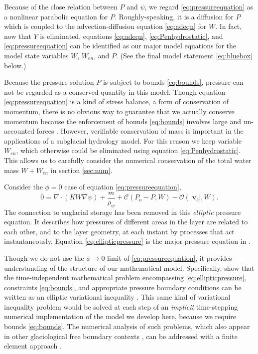 \documentclass[11pt,final]{amsart}
\newcommand\bv{\mathbf{v}}
\newcommand{\Div}{\nabla\cdot}
\newcommand{\grad}{\nabla}
\begin{document}
Because of the close relation between $P$ and $\psi$, we regard \eqref{eq:pressureequation} as a nonlinear parabolic equation for $P$.  Roughly-speaking, it is a diffusion for $P$ which is coupled to the advection-diffusion equation \eqref{eq:adeqn} for $W$.  In fact, now that $Y$ is eliminated, equations \eqref{eq:adeqn}, \eqref{eq:Penhydrostatic}, and \eqref{eq:pressureequation} can be identified as our major model equations for the model state variables $W$, $W_{en}$, and $P$.  (See the final model statement \eqref{eq:bluebox} below.)

Because the pressure solution $P$ is subject to bounds \eqref{eq:bounds}, pressure can not be regarded as a conserved quantity in this model.  Though equation \eqref{eq:pressureequation} is a kind of stress balance, a form of conservation of momentum, there is no obvious way to guarantee that we actually conserve momentum because the enforcement of bounds \eqref{eq:bounds} involves large and un-accounted forces \citep{Schoofetal2012}.  However, verifiable conservation of mass is important in the applications of a subglacial hydrology model.  For this reason we keep variable $W_{en}$, which otherwise could be eliminated using equation \eqref{eq:Penhydrostatic}.  This allows us to carefully consider the numerical conservation of the total water mass $W+W_{en}$ in section \ref{sec:num}.

Consider the $\phi=0$ case of equation \eqref{eq:pressureequation},
\begin{equation}
0 = \Div\left(K W \grad \psi\right) + \frac{m}{\rho_w} + \mathcal{C}(P_o-P,W) - \mathcal{O}(|\bv_b|,W). \label{eq:ellipticpressure}
\end{equation}
The connection to englacial storage has been removed in this \emph{elliptic} pressure equation.  It describes how pressures of different areas in the layer are related to each other, and to the layer geometry, at each instant by processes that act instantaneously.  Equation \eqref{eq:ellipticpressure} is the major pressure equation in \citet[equations (2.12), (4.17a)]{Schoofetal2012}.

Though we do not use the $\phi\to 0$ limit of \eqref{eq:pressureequation}, it provides understanding of the structure of our mathematical model.  Specifically, \cite{Schoofetal2012} show that the time-independent mathematical problem encompassing \eqref{eq:ellipticpressure}, constraints \eqref{eq:bounds}, and appropriate pressure boundary conditions can be written as an elliptic variational inequality \citep{KinderlehrerStampacchia}.  This same kind of variational inequality problem would be solved at each step of an \emph{implicit} time-stepping numerical implementation of the model we develop here, because we require bounds \eqref{eq:bounds}.  The numerical analysis of such problems, which also appear in other glaciological free boundary contexts \citep{SchoofStream,JouvetBueler2012}, can be addressed with a finite element approach \citep{Ciarlet}.
\end{document}
